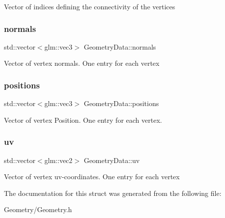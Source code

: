Vector of indices defining the connectivity of the vertices \mbox{\label{struct_geometry_data_a9d5d2dc295d76c6c218238ab55cb6dfb}} 
\subsubsection{\texorpdfstring{normals}{normals}}
{\footnotesize\ttfamily std\+::vector$<$glm\+::vec3$>$ Geometry\+Data\+::normals}

Vector of vertex normals. One entry for each vertex \mbox{\label{struct_geometry_data_a6376aec4b6a13ce5d3eab5c3eac93727}} 
\subsubsection{\texorpdfstring{positions}{positions}}
{\footnotesize\ttfamily std\+::vector$<$glm\+::vec3$>$ Geometry\+Data\+::positions}

Vector of vertex Position. One entry for each vertex. \mbox{\label{struct_geometry_data_a371ee416b0a725a0079f313dc42a965e}} 
\subsubsection{\texorpdfstring{uv}{uv}}
{\footnotesize\ttfamily std\+::vector$<$glm\+::vec2$>$ Geometry\+Data\+::uv}

Vector of vertex uv-\/coordinates. One entry for each vertex 

The documentation for this struct was generated from the following file\+:\begin{DoxyCompactItemize}
\item 
Geometry/Geometry.\+h\end{DoxyCompactItemize}
